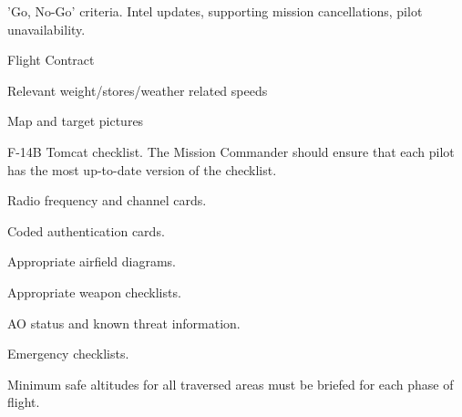 \begin{subsectionenumerate}
  \item 'Go, No-Go' criteria. Intel updates, supporting mission cancellations,
    pilot unavailability.

  \item Flight Contract

  \item Relevant weight/stores/weather related speeds

  \item Map and target pictures

  \item F-14B Tomcat checklist. The Mission Commander should ensure that each
    pilot has the most up-to-date version of the checklist.

  \item Radio frequency and channel cards.

  \item Coded authentication cards.

  \item Appropriate airfield diagrams.

  \item Appropriate weapon checklists.

  \item AO status and known threat information.

  \item Emergency checklists.

  \item Minimum safe altitudes for all traversed areas must be briefed for each
    phase of flight.

\end{subsectionenumerate}


